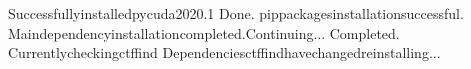 \documentclass[a4paper,10pt,english]{sphinxmanual}
\begin{document}
\begin{sphinxVerbatim}[commandchars=\\\{\}]
Successfullyinstalledpycuda\PYGZhy{}2020.1
\PYGZhy{}\PYGZhy{}\PYGZhy{}\PYGZhy{}\PYGZhy{}\PYGZhy{}\PYGZhy{}\PYGZhy{}\PYGZhy{}\PYGZhy{}\PYGZhy{}\PYGZhy{}\PYGZhy{}\PYGZhy{}\PYGZhy{}\PYGZhy{}\PYGZhy{}\PYGZhy{}\PYGZhy{}\PYGZhy{}\PYGZhy{}\PYGZhy{}\PYGZhy{}\PYGZhy{}\PYGZhy{}\PYGZhy{}\PYGZhy{}\PYGZhy{}\PYGZhy{}\PYGZhy{}\PYGZhy{}\PYGZhy{}\PYGZhy{}\PYGZhy{}\PYGZhy{}\PYGZhy{}\PYGZhy{}\PYGZhy{}\PYGZhy{}\PYGZhy{}\PYGZhy{}\PYGZhy{}\PYGZhy{}\PYGZhy{}\PYGZhy{}\PYGZhy{}\PYGZhy{}\PYGZhy{}\PYGZhy{}\PYGZhy{}\PYGZhy{}\PYGZhy{}\PYGZhy{}\PYGZhy{}\PYGZhy{}\PYGZhy{}\PYGZhy{}\PYGZhy{}\PYGZhy{}\PYGZhy{}\PYGZhy{}\PYGZhy{}\PYGZhy{}\PYGZhy{}\PYGZhy{}\PYGZhy{}\PYGZhy{}\PYGZhy{}\PYGZhy{}\PYGZhy{}\PYGZhy{}\PYGZhy{}
Done.
pippackagesinstallationsuccessful.
\PYGZhy{}\PYGZhy{}\PYGZhy{}\PYGZhy{}\PYGZhy{}\PYGZhy{}\PYGZhy{}\PYGZhy{}\PYGZhy{}\PYGZhy{}\PYGZhy{}\PYGZhy{}\PYGZhy{}\PYGZhy{}\PYGZhy{}\PYGZhy{}\PYGZhy{}\PYGZhy{}\PYGZhy{}\PYGZhy{}\PYGZhy{}\PYGZhy{}\PYGZhy{}\PYGZhy{}\PYGZhy{}\PYGZhy{}\PYGZhy{}\PYGZhy{}\PYGZhy{}\PYGZhy{}\PYGZhy{}\PYGZhy{}\PYGZhy{}\PYGZhy{}\PYGZhy{}\PYGZhy{}\PYGZhy{}\PYGZhy{}\PYGZhy{}\PYGZhy{}\PYGZhy{}\PYGZhy{}\PYGZhy{}\PYGZhy{}\PYGZhy{}\PYGZhy{}\PYGZhy{}\PYGZhy{}\PYGZhy{}\PYGZhy{}\PYGZhy{}\PYGZhy{}\PYGZhy{}\PYGZhy{}\PYGZhy{}\PYGZhy{}\PYGZhy{}\PYGZhy{}\PYGZhy{}\PYGZhy{}\PYGZhy{}\PYGZhy{}\PYGZhy{}\PYGZhy{}\PYGZhy{}\PYGZhy{}\PYGZhy{}\PYGZhy{}\PYGZhy{}\PYGZhy{}\PYGZhy{}\PYGZhy{}
Maindependencyinstallationcompleted.Continuing...
\PYGZhy{}\PYGZhy{}\PYGZhy{}\PYGZhy{}\PYGZhy{}\PYGZhy{}\PYGZhy{}\PYGZhy{}\PYGZhy{}\PYGZhy{}\PYGZhy{}\PYGZhy{}\PYGZhy{}\PYGZhy{}\PYGZhy{}\PYGZhy{}\PYGZhy{}\PYGZhy{}\PYGZhy{}\PYGZhy{}\PYGZhy{}\PYGZhy{}\PYGZhy{}\PYGZhy{}\PYGZhy{}\PYGZhy{}\PYGZhy{}\PYGZhy{}\PYGZhy{}\PYGZhy{}\PYGZhy{}\PYGZhy{}\PYGZhy{}\PYGZhy{}\PYGZhy{}\PYGZhy{}\PYGZhy{}\PYGZhy{}\PYGZhy{}\PYGZhy{}\PYGZhy{}\PYGZhy{}\PYGZhy{}\PYGZhy{}\PYGZhy{}\PYGZhy{}\PYGZhy{}\PYGZhy{}\PYGZhy{}\PYGZhy{}\PYGZhy{}\PYGZhy{}\PYGZhy{}\PYGZhy{}\PYGZhy{}\PYGZhy{}\PYGZhy{}\PYGZhy{}\PYGZhy{}\PYGZhy{}\PYGZhy{}\PYGZhy{}\PYGZhy{}\PYGZhy{}\PYGZhy{}\PYGZhy{}\PYGZhy{}\PYGZhy{}\PYGZhy{}\PYGZhy{}\PYGZhy{}\PYGZhy{}
Completed.
Currentlycheckingctffind
Dependenciesctffindhavechanged\PYGZhy{}reinstalling...
\PYGZhy{}\PYGZhy{}\PYGZhy{}\PYGZhy{}\PYGZhy{}\PYGZhy{}\PYGZhy{}\PYGZhy{}\PYGZhy{}\PYGZhy{}\PYGZhy{}\PYGZhy{}\PYGZhy{}\PYGZhy{}\PYGZhy{}\PYGZhy{}\PYGZhy{}\PYGZhy{}\PYGZhy{}\PYGZhy{}\PYGZhy{}\PYGZhy{}\PYGZhy{}\PYGZhy{}\PYGZhy{}\PYGZhy{}\PYGZhy{}\PYGZhy{}\PYGZhy{}\PYGZhy{}\PYGZhy{}\PYGZhy{}\PYGZhy{}\PYGZhy{}\PYGZhy{}\PYGZhy{}\PYGZhy{}\PYGZhy{}\PYGZhy{}\PYGZhy{}\PYGZhy{}\PYGZhy{}\PYGZhy{}\PYGZhy{}\PYGZhy{}\PYGZhy{}\PYGZhy{}\PYGZhy{}\PYGZhy{}\PYGZhy{}\PYGZhy{}\PYGZhy{}\PYGZhy{}\PYGZhy{}\PYGZhy{}\PYGZhy{}\PYGZhy{}\PYGZhy{}\PYGZhy{}\PYGZhy{}\PYGZhy{}\PYGZhy{}\PYGZhy{}\PYGZhy{}\PYGZhy{}\PYGZhy{}\PYGZhy{}\PYGZhy{}\PYGZhy{}\PYGZhy{}\PYGZhy{}\PYGZhy{}

\end{sphinxVerbatim}
\end{document}
